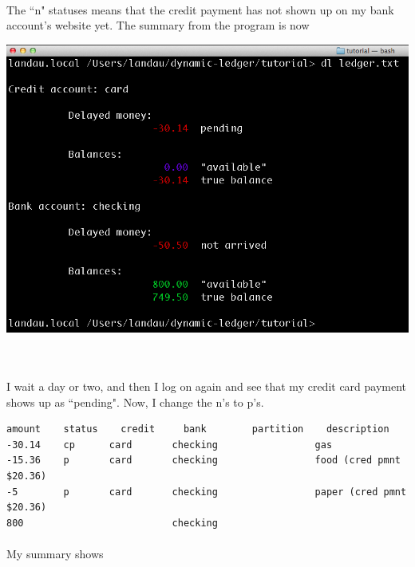 \documentclass{article}
\providecommand{\q}{$\quad$ \newline}
\begin{document}
\begin{flushleft}
\paragraph{} The ``n" statuses means that the credit payment has not shown up on my bank account's website yet. The summary from the program is now \q

\begin{center}
\includegraphics[scale=.45]{fig/sum5.png}
\end{center} \q

\paragraph{} I wait a day or two, and then I log on again and see that my credit card payment shows up as ``pending". Now, I change the n's to p's.

\begin{lstlisting}[title=ledger.txt]
amount    status	credit     bank        partition    description
-30.14    cp      card       checking                 gas
-15.36    p       card       checking                 food (cred pmnt $20.36)
-5        p       card       checking                 paper (cred pmnt $20.36)
800                          checking
\end{lstlisting}

\paragraph{} My summary shows


\end{flushleft}
\end{document}
